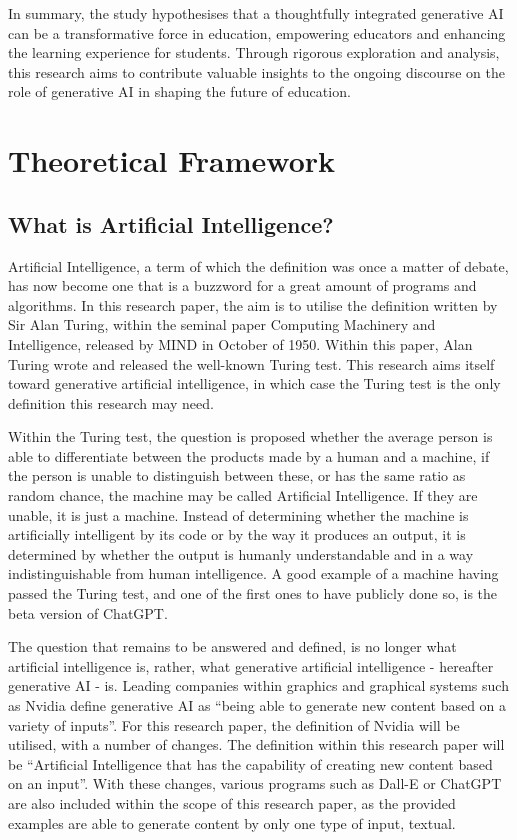 \documentclass[a4paper,12pt]{report}
\begin{document}
In summary, the study hypothesises that a thoughtfully integrated generative AI can be a transformative force in education, empowering educators and enhancing the learning experience for students. Through rigorous exploration and analysis, this research aims to contribute valuable insights to the ongoing discourse on the role of generative AI in shaping the future of education.

\chapter{Theoretical Framework} \label{chap:theoretical}
\newpage
\section{What is Artificial Intelligence?} \label{sect:AI}
\hspace{10mm} Artificial Intelligence, a term of which the definition was once a matter of debate, has now become one that is a buzzword for a great amount of programs and algorithms. In this research paper, the aim is to utilise the definition written by Sir Alan Turing, within the seminal paper Computing Machinery and Intelligence, released by MIND in October of 1950. Within this paper, Alan Turing wrote and released the well-known Turing test. This research aims itself toward generative artificial intelligence, in which case the Turing test is the only definition this research may need.

Within the Turing test, the question is proposed whether the average person is able to differentiate between the products made by a human and a machine, if the person is unable to distinguish between these, or has the same ratio as random chance, the machine may be called Artificial Intelligence. If they are unable, it is just a machine. Instead of determining whether the machine is artificially intelligent by its code or by the way it produces an output, it is determined by whether the output is humanly understandable and in a way indistinguishable from human intelligence. A good example of a machine having passed the Turing test, and one of the first ones to have publicly done so, is the beta version of ChatGPT.

The question that remains to be answered and defined, is no longer what artificial intelligence is, rather, what generative artificial intelligence - hereafter generative AI - is. Leading companies within graphics and graphical systems such as Nvidia define generative AI as “being able to generate new content based on a variety of inputs”. For this research paper, the definition of Nvidia will be utilised, with a number of changes. The definition within this research paper will be “Artificial Intelligence that has the capability of creating new content based on an input”. With these changes, various programs such as Dall-E or ChatGPT are also included within the scope of this research paper, as the provided examples are able to generate content by only one type of input, textual.
\end{document}
